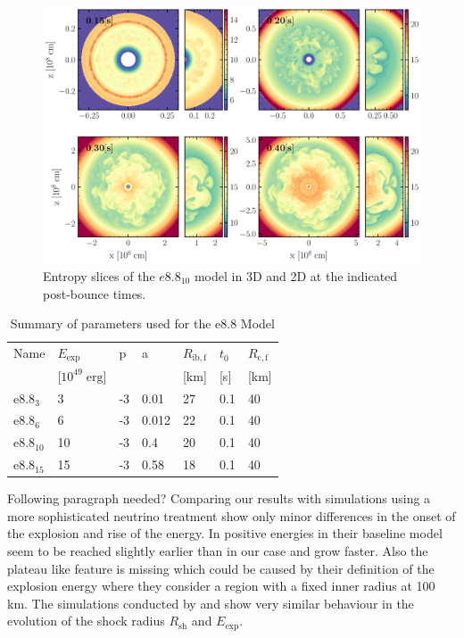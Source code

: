 \documentclass[fleqn,usenatbib]{mnras}
\newcommand{\COM}[1]{{\color{red}#1}}
\begin{document}
\begin{figure}
 \includegraphics[width=\textwidth]{pic/e8_10_2d3d_sto_cuts_4times.pdf}
 \caption{Entropy slices of the $e8.8_{10}$ model in 3D and 2D at the indicated post-bounce times. }
 \label{fig:e8 sto 4 times}
\end{figure}


\begin{table}
   \begin{tabular}{l| l | l | l | l | l | l}
  \label{table:e8param}
  Name &$E_{\mathrm{exp}}$& p & a & $R_{\mathrm{ib,f}}$ & $t_0$ & $R_{\mathrm{c,f}}$\\
                & [$10^{49}\; \mathrm{erg}$] &   &   & [km]  & [s]& [km] \\
  \hline \hline
  $\mathrm{e}8.8_{3}$  &  3 &    -3 & 0.01 &27 & 0.1 & 40 \\
  $\mathrm{e}8.8_{6}$  &  6 &   -3 & 0.012 &22 & 0.1 & 40 \\
  $\mathrm{e}8.8_{10}$ & 10 &   -3 & 0.4 & 20 & 0.1 & 40 \\
  $\mathrm{e}8.8_{15}$ & 15 &   -3 & 0.58 & 18 & 0.1 & 40 \\
  \end{tabular}
\caption{Summary of parameters used for the e8.8 Model}
\end{table}

\COM{Following paragraph needed?}
Comparing our results with simulations using a more sophisticated neutrino treatment show only minor differences in the onset of the explosion and rise of the energy. In \cite{Radice2017} positive energies in their baseline model seem to be reached slightly earlier than in our case and grow faster. Also the plateau like feature is missing which could be caused by their definition of the explosion energy where they consider a region with a fixed inner radius at 100 km. The simulations conducted by \cite{Groote2014} and \cite{Janka2008} show very similar behaviour in the evolution of the shock radius $R_{\mathrm{sh}}$ and $E_{\mathrm{exp}}$. 
\end{document}
